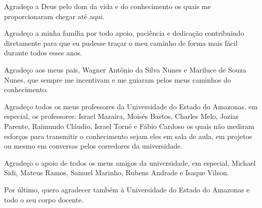 
\begin{agradecimentos}[AGRADECIMENTOS]

Agradeço a Deus pelo dom da vida e do conhecimento os quais me proporcionaram chegar até aqui.

Agradeço a minha família por todo apoio, paciência e dedicação contribuindo diretamente para que eu pudesse traçar o meu caminho de forma mais fácil durante todos esses anos.

Agradeço aos meus pais, Wagner Antônio da Silva Nunes e Mariluce de Souza Nunes, que sempre me incentivam e me guiaram pelos meus caminhos do conhecimento.

Agradeço todos os meus professores da Universidade do Estado do Amazonas, em especial, os professores: Israel Mazaira, Moisés Bastos, Charles Melo, Jozias Parente, Raimundo Cláudio, Israel Torné e Fábio Cardoso os quais não mediram esforços para transmitir o conhecimento sejam eles em sala de aula, em projetos ou mesmo em conversas pelos corredores da universidade.

Agradeço o apoio de todos os meus amigos da universidade, em especial, Michael Sidi, Mateus Ramos, Samuel Marinho, Rubens Andrade e Isaque Vilson.

Por último, quero agradecer também à Universidade do Estado do Amazonas e todo o seu corpo docente.


\end{agradecimentos}
